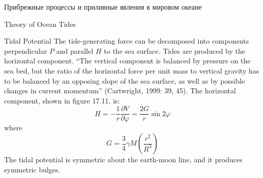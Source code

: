 \begin{chapter}{Прибрежные процессы и приливные явления в мировом океане}
\begin{section}{Theory of Ocean Tides}
\begin{paragraph}{Tidal Potential}
The tide-generating force can be decomposed into components
perpendicular $P$ and parallel $H$ to the sea surface. Tides are
produced by the horizontal component. ``The vertical component is
balanced by pressure on the sea bed, but the ratio of the horizontal
force per unit mass to vertical gravity has to be balanced by an
opposing slope of the sea surface, as well as by possible changes in
current momentum'' (Cartwright, 1999: 39, 45). The horizontal
component, shown in figure 17.11, is:
\begin{equation}
H = - \frac{1}{r} \frac{\partial V}{\partial\varphi} = \frac{2 G}{r} \sin
2\varphi
\end{equation}
where
\begin{equation}
G = \frac{3}{4} \gamma M \left( \frac{r^{2}}{R^{3}} \right)
\end{equation}
The tidal potential is symmetric about the earth-moon
line, and it produces symmetric bulges.
%


\end{paragraph}
\end{section}
\end{chapter}
